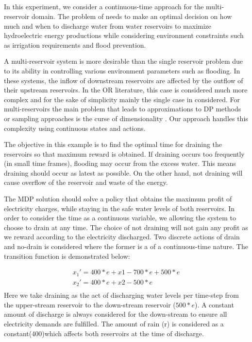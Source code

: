 \subsection{\WaterReservoir}

In this experiment, we consider a continuous-time approach for the multi-reservoir domain.  
The problem of \WaterReservoir  needs to make an optimal decision on how much and when to discharge water from water reservoirs to maximize hydroelectric energy productions while considering environment constraints such as irrigation requirements and flood prevention. 

A multi-reservoir system is more desirable than the single reservoir problem due to its ability in controlling various environment parameters such as flooding.  In these systems, the inflow of downstream reservoirs are affected by the outflow of their upstream reservoirs. In the OR literature, this case  is considered much more complex and for the sake of simplicity mainly the single case in considered. For multi-reservoirs the main problem that leads to approximations to DP methods or sampling approaches is the curse of dimensionality \cite{Mahootchi2009}. Our approach handles this complexity using continuous states and actions.

The objective in this example is to find the optimal time for draining the reservoirs so that maximum reward is obtained. If draining occurs too frequently (in small time frames), flooding may occur from the excess water. This means draining should occur as latest as possible. On the other hand, not draining will cause overflow of the reservoir and waste of the energy. 

The MDP solution should solve a policy that obtains the maximum profit of electricity charges, while staying in the safe water levels of both reservoirs. In order to consider the time as a continuous variable, we allowing the system to choose to drain at any time. The choice of not draining will not gain any profit as we reward according to the electricity discharged. Two discrete actions of drain and no-drain is considered where the former is a of a continuous-time  nature. The transition function is demonstrated below: 

{\footnotesize
\begin{align*}
x_1'  = 400 * e + x1 -700 * e + 500 * e \\
x_2'  = 400 * e + x2 - 500 * e \\
\end{align*}
}
Here we take draining as the act of discharging water levels per time-step from the upper-stream reservoir to the down-stream reservoir ($500 * e$). A constant amount of discharge is always considered for the down-stream to ensure all electricity demands are fulfilled.  The amount of rain (r) is considered as a constant(400)which affects both reservoirs at the time of discharge. 

